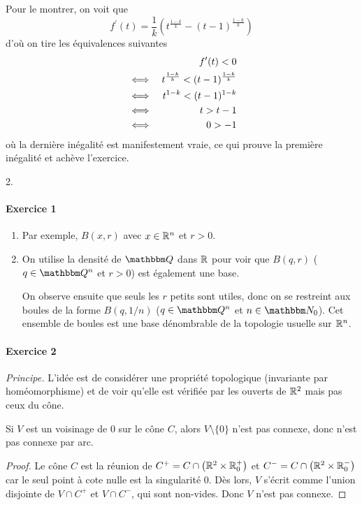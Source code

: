    Pour le montrer, on voit que
   \[f^\prime(t) = \frac 1k \left(t^{\frac{1-k}k} -
     ({t-1})^{\frac{1-k}k}\right)\] d'où on tire les équivalences
   suivantes
   \begin{align}
     & & f^\prime(t) < 0\\
     &\iff& t^{\frac{1-k}k} < ({t-1})^{\frac{1-k}k}\\
     &\iff& t^{1-k} < ({t-1})^{1-k}\\
     &\iff& t > t-1\\
     &\iff& 0 > -1
   \end{align}
   où la dernière inégalité est manifestement vraie, ce qui prouve la
   première inégalité et achève l'exercice.

   2.


 \paragraph{Exercice 1}
 \begin{enumerate}
 \item Par exemple, $B(x,r)$ avec $x \in \mathbb{R}^n$ et $r > 0$.

 \item On utilise la densité de $\Q$ dans $\mathbb{R}$ pour voir que $B(q,r)$
   ($q \in \Q^n$ et $r > 0$) est également une base.

   On observe ensuite que seuls les $r$ \og petits\fg{} sont utiles,
   donc on se restreint aux boules de la forme $B(q,1/n)$ ($q \in
   \Q^n$ et $n \in \N_0$). Cet ensemble de boules est une base
   dénombrable de la topologie usuelle sur
   $\mathbb{R}^n$.
 \end{enumerate}

 \paragraph{Exercice 2}
 \emph{Principe.} L'idée est de considérer une propriété topologique
 (invariante par homéomorphisme) et de voir qu'elle est vérifiée par
 les ouverts de $\mathbb{R}^2$ mais pas ceux du cône.

 \begin{lem}Si $V$ est un voisinage de $0$ sur le cône $C$, alors
   $V\setminus\{0\}$ n'est pas connexe, donc n'est pas connexe par
   arc.\end{lem}
 \begin{proof}Le cône $C$ est la réunion de $C^+ = C \cap
   \left(\mathbb{R}^2\times \mathbb{R}_0^+\right)$ et $C^- = C \cap \left(\mathbb{R}^2\times
     \mathbb{R}_0^-\right)$ car le seul point à cote nulle est la singularité
   $0$. Dès lors, $V$ s'écrit comme l'union disjointe de $V\cap C^+$
   et $V\cap C^-$, qui sont non-vides. Donc $V$ n'est pas
   connexe.\end{proof}

